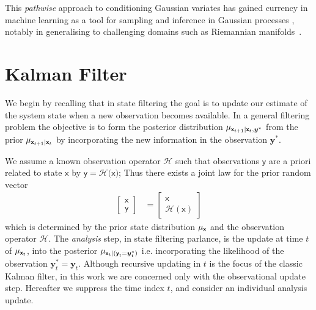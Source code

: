 \documentclass[wcp]{jmlr} %
\newcommand{\vv}[1]{\boldsymbol{#1}}
\newcommand{\rv}[1]{\mathsf{#1}}
\newcommand{\vrv}[1]{\vv{\rv{#1}}}
\newcommand{\op}[1]{\mathcal{#1}}
\newcommand{\gvn}{\mid}
\begin{document}
This \emph{pathwise} approach to conditioning Gaussian variates has gained currency in machine learning as a tool for sampling and inference in Gaussian processes \citep{Wilson2020Efficiently,Wilson2021Pathwise}, notably in generalising to challenging domains such as Riemannian manifolds~\citep{Borovitskiy2020Matern}.

\section{Kalman Filter}
We begin by recalling that in state filtering the goal is to update our estimate of the system state when a new observation becomes available. In a general filtering problem the objective is to form the posterior distribution \(\Law[\vrv{x}_{t+1} \gvn \vrv{x}_t, \vv{y}^*]\) from the prior \(\Law[\vrv{x}_{t+1} \gvn \vrv{x}_t]\) by incorporating the new information in the observation \(\vv{y}^*\).

We assume a known observation operator $\op{H}$ such that observations $\vrv{y}$ are a priori related to state $\vrv{x}$ by $\vrv{y}=\op{H}(\vrv{x}\vrv)$; Thus there exists a joint law for the prior random vector
\begin{align}
    \begin{bmatrix}
        \vrv{x}\\
        \vrv{y}
    \end{bmatrix} &= \begin{bmatrix}
        \vrv{x}\\
        \op{H}(\vrv{x})
    \end{bmatrix}\label{eq:joint-law}
\end{align}
which is determined by the prior state distribution $\Law[\vrv{x}]$ and the observation operator $\op{H}$.
The  \emph {analysis} step, in state filtering parlance, is the update at time $t$ of  \(\Law[\vrv{x}_{t}]\), into the posterior \( \Law[\vrv{x}_t \gvn (\vrv{y}_t{=}\vv{y}_t^*)]\)
i.e. incorporating the likelihood of the observation $\vv{y}_t^*=\vv{y}_t$.
Although  recursive updating in $t$ is the focus of the classic Kalman filter, in this work we are concerned only with the observational update step.
Hereafter we suppress the time index $t$, and consider an individual analysis update.
\end{document}
